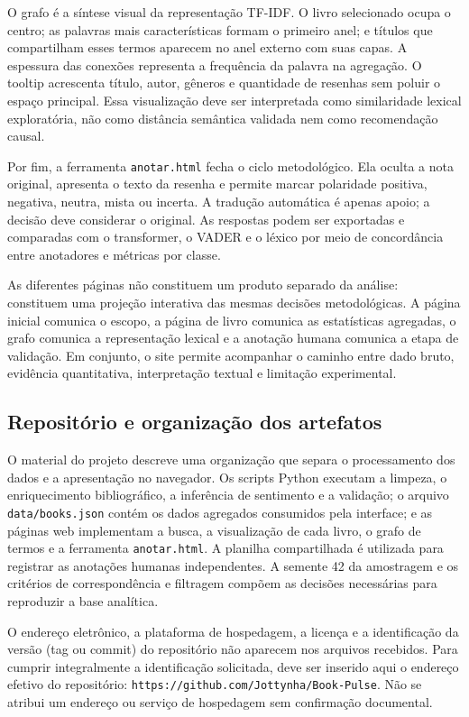 \documentclass[conference]{IEEEtran}
\begin{document}
O grafo é a síntese visual da representação TF-IDF. O livro selecionado ocupa
o centro; as palavras mais características formam o primeiro anel; e títulos
que compartilham esses termos aparecem no anel externo com suas capas. A
espessura das conexões representa a frequência da palavra na agregação. O
tooltip acrescenta título, autor, gêneros e quantidade de resenhas sem
poluir o espaço principal. Essa visualização deve ser interpretada como
similaridade lexical exploratória, não como distância semântica validada nem
como recomendação causal.

Por fim, a ferramenta \texttt{anotar.html} fecha o ciclo metodológico. Ela
oculta a nota original, apresenta o texto da resenha e permite marcar
polaridade positiva, negativa, neutra, mista ou incerta. A tradução automática
é apenas apoio; a decisão deve considerar o original. As respostas podem ser
exportadas e comparadas com o transformer, o VADER e o léxico por meio de
concordância entre anotadores e métricas por classe.

As diferentes páginas não constituem um produto separado da análise: constituem uma projeção
interativa das mesmas decisões metodológicas. A página inicial comunica o escopo, a
página de livro comunica as estatísticas agregadas, o grafo comunica a
representação lexical e a anotação humana comunica a etapa de validação. Em
conjunto, o site permite acompanhar o caminho entre dado bruto, evidência
quantitativa, interpretação textual e limitação experimental.

\subsection{Repositório e organização dos artefatos}

O material do projeto descreve uma organização que separa o processamento dos
dados e a apresentação no navegador. Os scripts Python executam a limpeza,
o enriquecimento bibliográfico, a inferência de sentimento e a validação; o
arquivo \texttt{data/books.json} contém os dados agregados consumidos pela
interface; e as páginas web implementam a busca, a visualização de cada livro,
o grafo de termos e a ferramenta \texttt{anotar.html}. A planilha compartilhada
é utilizada para registrar as anotações humanas independentes. A semente 42 da
amostragem e os critérios de correspondência e filtragem compõem as decisões
necessárias para reproduzir a base analítica.

O endereço eletrônico, a plataforma de hospedagem, a licença e a identificação
da versão (tag ou commit) do repositório não aparecem nos arquivos recebidos.
Para cumprir integralmente a identificação solicitada, deve ser inserido aqui
o endereço efetivo do repositório: \texttt{https://github.com/Jottynha/Book-Pulse}. Não se
atribui um endereço ou serviço de hospedagem sem confirmação documental.
\end{document}
